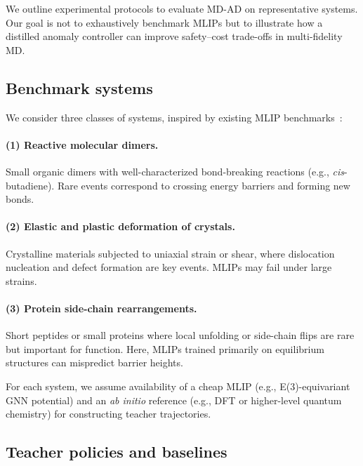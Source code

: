 \documentclass{article}
\begin{document}
We outline experimental protocols to evaluate MD-AD on representative systems. Our goal is not to exhaustively benchmark MLIPs but to illustrate how a distilled anomaly controller can improve safety--cost trade-offs in multi-fidelity MD.

\subsection{Benchmark systems}

We consider three classes of systems, inspired by existing MLIP benchmarks~\cite{fu2022forcesnot,kulichenko2024datagen}:

\paragraph{(1) Reactive molecular dimers.}
Small organic dimers with well-characterized bond-breaking reactions (e.g., \textit{cis}-butadiene). Rare events correspond to crossing energy barriers and forming new bonds.

\paragraph{(2) Elastic and plastic deformation of crystals.}
Crystalline materials subjected to uniaxial strain or shear, where dislocation nucleation and defect formation are key events. MLIPs may fail under large strains.

\paragraph{(3) Protein side-chain rearrangements.}
Short peptides or small proteins where local unfolding or side-chain flips are rare but important for function. Here, MLIPs trained primarily on equilibrium structures can mispredict barrier heights.

For each system, we assume availability of a cheap MLIP (e.g., E(3)-equivariant GNN potential) and an \emph{ab initio} reference (e.g., DFT or higher-level quantum chemistry) for constructing teacher trajectories.

\subsection{Teacher policies and baselines}
\end{document}
